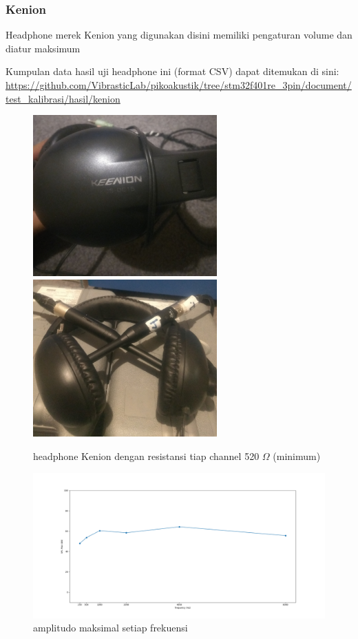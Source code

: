 \documentclass[12pt,]{article}
\begin{document}
	\subsubsection{Kenion}
	
	Headphone merek Kenion yang digunakan disini memiliki pengaturan volume dan diatur maksimum
	
	Kumpulan data hasil uji headphone ini (format CSV) dapat ditemukan di sini:\\
	\url{https://github.com/VibrasticLab/pikoakustik/tree/stm32f401re_3pin/document/test_kalibrasi/hasil/kenion}
	
	\begin{figure}[!ht]
		\centering
		\includegraphics[width=200pt]{hasil/kenion/kenion}
		\includegraphics[width=200pt]{hasil/kenion/kenion_setup}
		\caption{headphone Kenion dengan resistansi tiap channel 520 $\Omega$ (minimum)}
	\end{figure}
	
	\newpage
	\begin{figure}[!ht]
		\centering
		\includegraphics[width=500pt]{hasil/kenion/maxallfreq/max_freq}
		\caption{amplitudo maksimal setiap frekuensi}
	\end{figure}
	
\end{document}

